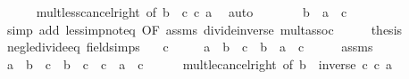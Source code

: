 \begin{isabellebody}
\ \ \ \ \isamarkupfalse%
\ mult{\isacharunderscore}{\kern0pt}less{\isacharunderscore}{\kern0pt}cancel{\isacharunderscore}{\kern0pt}right\ {\isacharbrackleft}{\kern0pt}of\ {\isachardoublequoteopen}b\ {\isacharslash}{\kern0pt}\ c{\isachardoublequoteclose}\ c\ a{\isacharbrackright}{\kern0pt}\ \isamarkupfalse%
\ auto\isanewline
\ \ \isamarkupfalse%
\ \isamarkupfalse%
\ {\isachardoublequoteopen}{\isachardot}{\kern0pt}{\isachardot}{\kern0pt}{\isachardot}{\kern0pt}\ {\isasymlongleftrightarrow}\ b\ {\isacharless}{\kern0pt}\ a\ {\isacharasterisk}{\kern0pt}\ c{\isachardoublequoteclose}\isanewline
\ \ \ \ \isamarkupfalse%
\ {\isacharparenleft}{\kern0pt}simp\ add{\isacharcolon}{\kern0pt}\ less{\isacharunderscore}{\kern0pt}imp{\isacharunderscore}{\kern0pt}not{\isacharunderscore}{\kern0pt}eq\ {\isacharbrackleft}{\kern0pt}OF\ assms{\isacharbrackright}{\kern0pt}\ divide{\isacharunderscore}{\kern0pt}inverse\ mult{\isachardot}{\kern0pt}assoc{\isacharparenright}{\kern0pt}\isanewline
\ \ \isamarkupfalse%
\ \isamarkupfalse%
\ {\isacharquery}{\kern0pt}thesis\ \isacommand{{\isachardot}{\kern0pt}}\isamarkupfalse%
\isanewline
{}\isamarkupfalse%
%
\endisatagproof
{\isafoldproof}%
%
\isadelimproof
\isanewline
%
\endisadelimproof
\isanewline
{}\isamarkupfalse%
\ neg{\isacharunderscore}{\kern0pt}le{\isacharunderscore}{\kern0pt}divide{\isacharunderscore}{\kern0pt}eq\ {\isacharbrackleft}{\kern0pt}field{\isacharunderscore}{\kern0pt}simps{\isacharbrackright}{\kern0pt}{\isacharcolon}{\kern0pt}\isanewline
\ \ \ {\isachardoublequoteopen}c\ {\isacharless}{\kern0pt}\ {}{\isachardoublequoteclose}\isanewline
\ \ \ {\isachardoublequoteopen}a\ {\isasymle}\ b\ {\isacharslash}{\kern0pt}\ c\ {\isasymlongleftrightarrow}\ b\ {\isasymle}\ a\ {\isacharasterisk}{\kern0pt}\ c{\isachardoublequoteclose}\isanewline
%
\isadelimproof
%
\endisadelimproof
%
\isatagproof
{}\isamarkupfalse%
\ {\isacharminus}{\kern0pt}\isanewline
\ \ \isamarkupfalse%
\ assms\ \isamarkupfalse%
\ {\isachardoublequoteopen}a\ {\isasymle}\ b\ {\isacharslash}{\kern0pt}\ c\ {\isasymlongleftrightarrow}\ {\isacharparenleft}{\kern0pt}b\ {\isacharslash}{\kern0pt}\ c{\isacharparenright}{\kern0pt}\ {\isacharasterisk}{\kern0pt}\ c\ {\isasymle}\ a\ {\isacharasterisk}{\kern0pt}\ c{\isachardoublequoteclose}\isanewline
\ \ \ \ \isamarkupfalse%
\ mult{\isacharunderscore}{\kern0pt}le{\isacharunderscore}{\kern0pt}cancel{\isacharunderscore}{\kern0pt}right\ {\isacharbrackleft}{\kern0pt}of\ {\isachardoublequoteopen}b\ {\isacharasterisk}{\kern0pt}\ inverse\ c{\isachardoublequoteclose}\ c\ a{\isacharbrackright}{\kern0pt}\ \isamarkupfalse%

\end{isabellebody}
